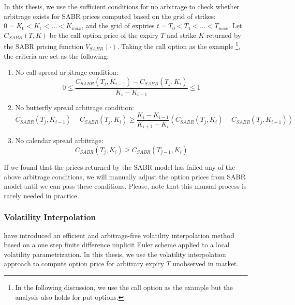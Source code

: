 \documentclass[letterpaper,12pt,titlepage,oneside,final]{book}
\numberwithin{equation}{section}
\theoremstyle{definition}
\begin{document}
In this thesis, we use the sufficient conditions for no arbitrage \cite{carr2005note} to check whether arbitrage exists for SABR prices computed based on  the grid of strikes: $0=K_0<K_1<\dots<K_{max}$, and the grid of expiries $t=T_0 < T_1 < \dots< T_{max} $. Let $C_{SABR}(T,K)$ be the call option price of  the expiry $T$ and strike $K$ returned by the SABR pricing function $V_{SABR}(\cdot)$. Taking the call option as the example \footnote{In the following discussion, we use the call option as the example but the analysis also holds for put options.}, the criteria are set as the following: 
\begin{enumerate}
	\item No call spread arbitrage condition:
\[
0 \leq \frac{C_{SABR}(T_{j},K_{i-1})-C_{SABR}(T_{j},K_{i})}{K_i-K_{i-1}} \leq 1
\]

	\item  No butterfly spread arbitrage condition:
	 \[
	C_{SABR}(T_{j},K_{i-1})-C_{SABR}(T_{j},K_{i}) \geq \frac{K_i-K_{i-1}}{K_{i+1}-K_{i}}
	\left( C_{SABR}(T_{j},K_{i})-C_{SABR}(T_{j},K_{i+1})  \right)
	\]
	\item  No calendar spread arbitrage:
	\[
	C_{SABR}(T_{j},K_{i})\geq C_{SABR}(T_{j-1},K_{i})
	\]
\end{enumerate}

 
 If we found that the prices returned by the SABR model has failed any  of the above  arbitrage conditions, we will manually adjust the option prices from SABR model until we can pass these conditions. Please, note that this manual process is rarely needed in practice.

\subsubsection{Volatility Interpolation}
\citet{andreasen2010volatility} have introduced an efficient and arbitrage-free volatility interpolation method based on a one step finite difference implicit Euler scheme applied to a local volatility parametrization. In this thesis, we use the volatility interpolation approach to compute option price for arbitrary expiry $T$ unobserved in market.
\end{document}
